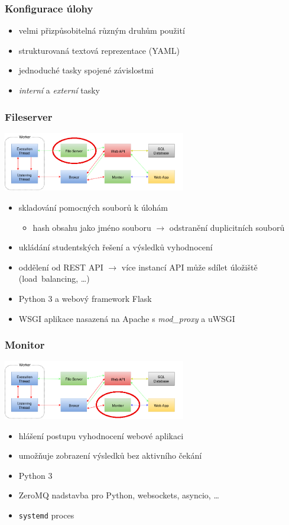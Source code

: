 \documentclass{beamer}
\begin{document}
\begin{frame}
	\frametitle{Konfigurace úlohy}
	\begin{itemize}
		\item velmi přizpůsobitelná různým druhům použití
		\item strukturovaná textová reprezentace (YAML)
		\item jednoduché tasky spojené závislostmi
		\item \textit{interní} a \textit{externí} tasky
	\end{itemize}
\end{frame}

\begin{frame}
	\frametitle{Fileserver}
	\begin{center}
		\includegraphics[width=0.6\textwidth]{images/communication-fileserver.png}
	\end{center}
	\begin{itemize}
		\item skladování pomocných souborů k úlohám
			\begin{itemize}
				\item hash obsahu jako jméno souboru $\rightarrow$ odstranění duplicitních souborů
			\end{itemize}
		\item ukládání studentských řešení a výsledků vyhodnocení
		\item oddělení od REST API $\rightarrow$ více instancí API může sdílet úložiště (load~balancing, \dots)
		\item Python 3 a webový framework Flask
		\item WSGI aplikace nasazená na Apache s {\it mod\_proxy} a uWSGI
	\end{itemize}
\end{frame}

\begin{frame}
	\frametitle{Monitor}
	\begin{center}
		\includegraphics[width=0.6\textwidth]{images/communication-monitor.png}
	\end{center}
	\begin{itemize}
		\item hlášení postupu vyhodnocení webové aplikaci
		\item umožňuje zobrazení výsledků bez aktivního čekání
		\item Python 3
		\item ZeroMQ nadstavba pro Python, websockets, asyncio, \dots
		\item \texttt{systemd} proces
	\end{itemize}
\end{frame}
\end{document}
